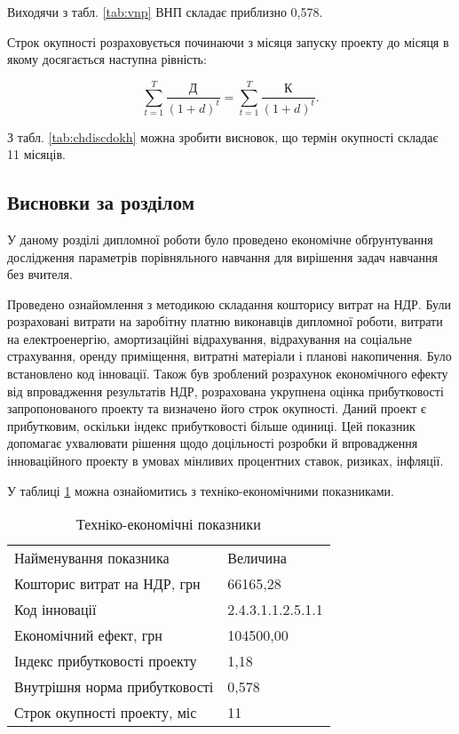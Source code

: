 Виходячи з табл. \ref{tab:vnp} ВНП складає приблизно 0,578.

Строк окупності розраховується починаючи з місяця запуску проекту до місяця в якому досягається наступна рівність:

\begin{equation}\label{eq:economy16}
	\sum_{t=1}^{T}\frac{\text{Д}}{(1 + d)^{t}} = \sum_{t=1}^{T}\frac{\text{К}}{(1 + d)^{t}}.
\end{equation}

\vspace{1.5em}

З табл. \ref{tab:chdiscdokh} можна зробити висновок, що термін окупності складає 11 місяців.

\subsection{Висновки за розділом}

У даному розділі дипломної роботи було проведено економічне обґрунтування дослідження параметрів порівняльного навчання для вирішення задач навчання без вчителя.

Проведено ознайомлення з методикою складання кошторису витрат на НДР. Були розраховані витрати на заробітну платню виконавців дипломної роботи, витрати на електроенергію, амортизаційні відрахування, відрахування на соціальне страхування, оренду приміщення, витратні матеріали і планові накопичення. Було встановлено код інновації. Також був зроблений розрахунок економічного ефекту від впровадження результатів НДР, розрахована укрупнена оцінка прибутковості запропонованого проекту та визначено його строк окупності. Даний проект є прибутковим, оскільки індекс прибутковості більше одиниці. Цей показник допомагає ухвалювати рішення щодо доцільності розробки й впровадження інноваційного проекту в умовах мінливих процентних ставок, ризиках, інфляції.

У таблиці \ref{tab:summary} можна ознайомитись з техніко-економічними показниками.

\begin{table}[h!]
	\captionstyle{ \raggedright}
	\caption{Техніко-економічні показники}\label{tab:summary}
	\begin{tabular}{| p{} | p{} |} 
		\hline
		Найменування показника & Величина \\
		\hlinewd{2pt}
		Кошторис витрат на НДР, грн & 66165,28 \\
		\hline
		Код інновації & 2.4.3.1.1.2.5.1.1 \\
		\hline
		Економічний ефект, грн & 104500,00 \\
		\hline
		Індекс прибутковості проекту & 1,18 \\
		\hline
		Внутрішня норма прибутковості & 0,578 \\
		\hline
		Строк окупності проекту, міс & 11 \\
		\hline
	\end{tabular}
\end{table}

